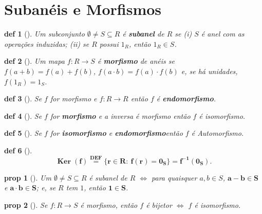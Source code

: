 \documentclass[11pt]{article}
\DeclareMathOperator{\Ker}{Ker}   %
\newcommand{\defname}[1]{\colorbox{yellow!30}{\strut \textbf{#1}}}
\newtheorem*{proposition}{prop}
\newtheorem*{definition}{def}
\theoremstyle{definition}
\begin{document}
\section{Subanéis e Morfismos}
\begin{multicols}{3}


\begin{definition}[\defname{Subanel}]
Um subconjunto \(\emptyset\neq S\subseteq R\) é \textbf{subanel} de \(R\) se (i) $S$ é anel com as operações induzidas; (ii) se $R$ possui $1_R$, então \(1_R\in S\).
\end{definition}

\begin{definition}[\defname{Morfismo (Homomorfismo) de Anéis}]
Um mapa \(f:R\to S\) é \textbf{morfismo} de anéis se
\(f(a+b)=f(a)+f(b)\),
\(f(a\cdot b)=f(a)\cdot f(b)\) e, se há unidades, \(f(1_R)=1_S\).
\end{definition}

\begin{definition}[\defname{Endomorfismo}]
Se $f$ for morfismo e \(f:R \to R\) então $f$ é \textbf{endomorfismo}. 
\end{definition}
\begin{definition}[\defname{Isomorfismo}]
Se $f$ for \textbf{morfismo} e a inversa é morfismo então $f$ é isomorfismo. 
\end{definition}
\begin{definition}[\defname{Automorfismo}]
Se $f$ for \textbf{isomorfismo} e \textbf{endomorfismo}então $f$ é Automorfismo. 
\end{definition}
\begin{definition}[\defname{Núcleo de um Morfismo}]
\[
\mathbf{\Ker(f)\stackrel{\text{DEF}}{=}\{r\in R:\ f(r)=0_S\}=f^{-1}(0_S)}.
\]
\end{definition}



\begin{proposition}[\defname{Caracterização de Subanel}]
Um \(\emptyset\neq S\subseteq R\) é subanel de \(R\) \(\iff\) para quaisquer \(a,b\in S\), \(\mathbf{a-b\in S}\) e \(\mathbf{a\cdot b\in S}\); e, se $R$ tem $1$, então \(\mathbf{1\in S}\).
\end{proposition}

\begin{proposition}[\defname{Morfismo Bijetor é Isomorfismo}]
Se \(f:R\to S\) é morfismo, então \(f\) é bijetor \(\iff\) \(f\) é isomorfismo.
\end{proposition}
\end{multicols}
\end{document}
